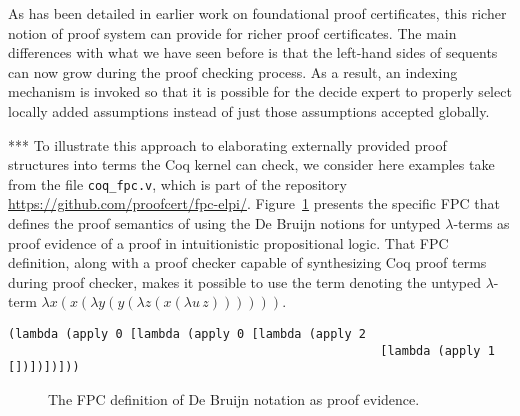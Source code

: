 As has been detailed in earlier work on foundational proof
certificates, this richer notion of proof system can provide for
richer proof certificates.  The main differences with what we have
seen before is that the left-hand sides of sequents can now grow
during the proof checking process.  As a result, an indexing mechanism
is invoked so that it is possible for the decide expert to properly
select locally added assumptions instead of just those assumptions
accepted globally.


*** To illustrate this approach to elaborating externally provided proof
structures into terms the Coq kernel can check, we consider here
examples take from the file \verb+coq_fpc.v+, which is part of the
repository \url{https://github.com/proofcert/fpc-elpi/}.
Figure~\ref{fig:debruijn} presents the specific FPC that defines the
proof semantics of using the De Bruijn notions for untyped
$\lambda$-terms as proof evidence of a proof in intuitionistic
propositional logic.  That FPC definition, along with a proof checker
capable of synthesizing Coq proof terms during proof checker, makes it
possible to use the term denoting the untyped $\lambda$-term
$\lambda x (x (\lambda y (y (\lambda z (x (\lambda u\,z))))))$.

\begin{lstlisting}[basicstyle=\ttfamily,language=lprolog]
(lambda (apply 0 [lambda (apply 0 [lambda (apply 2 
                                                    [lambda (apply 1 [])])])]))
\end{lstlisting}


\begin{figure}


\caption{The FPC definition of De Bruijn notation as proof evidence.}
\label{fig:debruijn}
\end{figure}




